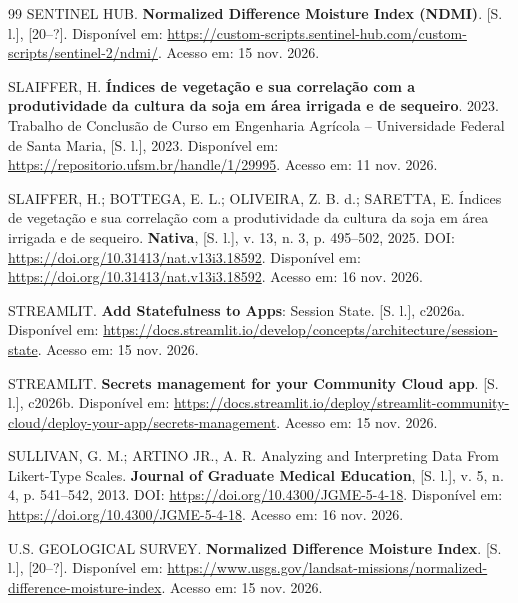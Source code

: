 \begin{thebibliography}{99}
\MakeUppercase{{Sentinel Hub}}.
\textbf{Normalized Difference Moisture Index (NDMI)}.
[S. l.], [20--?].
Disponível em: \url{https://custom-scripts.sentinel-hub.com/custom-scripts/sentinel-2/ndmi/}.
Acesso em: 15 nov. 2026.

\MakeUppercase{Slaiffer}, H.
\textbf{Índices de vegetação e sua correlação com a produtividade da cultura da soja em área irrigada e de sequeiro}.
2023.
Trabalho de Conclusão de Curso em Engenharia Agrícola -- Universidade Federal de Santa Maria, [S. l.], 2023.
Disponível em: \url{https://repositorio.ufsm.br/handle/1/29995}.
Acesso em: 11 nov. 2026.

\MakeUppercase{Slaiffer}, H.; \MakeUppercase{Bottega}, E. L.; \MakeUppercase{Oliveira}, Z. B. d.; \MakeUppercase{Saretta}, E.
Índices de vegetação e sua correlação com a produtividade da cultura da soja em área irrigada e de sequeiro.
\textbf{Nativa}, [S. l.],
v. 13,
n. 3,
p. 495--502,
2025.
DOI: \url{https://doi.org/10.31413/nat.v13i3.18592}.
Disponível em: \url{https://doi.org/10.31413/nat.v13i3.18592}.
Acesso em: 16 nov. 2026.

\MakeUppercase{{Streamlit}}.
\textbf{Add Statefulness to Apps}: Session State.
[S. l.], c2026a.
Disponível em: \url{https://docs.streamlit.io/develop/concepts/architecture/session-state}.
Acesso em: 15 nov. 2026.

\MakeUppercase{{Streamlit}}.
\textbf{Secrets management for your Community Cloud app}.
[S. l.], c2026b.
Disponível em: \url{https://docs.streamlit.io/deploy/streamlit-community-cloud/deploy-your-app/secrets-management}.
Acesso em: 15 nov. 2026.

\MakeUppercase{Sullivan}, G. M.; \MakeUppercase{Artino Jr.}, A. R.
Analyzing and Interpreting Data From {Likert}-Type Scales.
\textbf{Journal of Graduate Medical Education}, [S. l.],
v. 5,
n. 4,
p. 541--542,
2013.
DOI: \url{https://doi.org/10.4300/JGME-5-4-18}.
Disponível em: \url{https://doi.org/10.4300/JGME-5-4-18}.
Acesso em: 16 nov. 2026.

\MakeUppercase{{U.S. Geological Survey}}.
\textbf{Normalized Difference Moisture Index}.
[S. l.], [20--?].
Disponível em: \url{https://www.usgs.gov/landsat-missions/normalized-difference-moisture-index}.
Acesso em: 15 nov. 2026.


\end{thebibliography}
